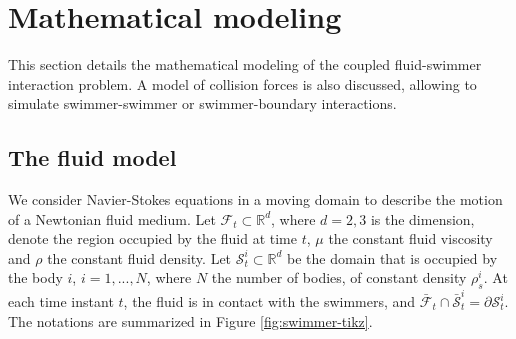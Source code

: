 \documentclass[graybox]{svmult}
\newcommand{\Fluid}{\mathcal{F}} %
\newcommand{\Real}{\mathbb{R}} %
\newcommand{\Density}{\rho} %
\newcommand{\Solid}{\mathcal{S}} %
\newcommand{\CompDomain}{\Fluid}
\newcommand{\R}{\mathbb{R}}
\begin{document}



\section{Mathematical modeling}
\label{Sec:MathModeling}
This section details the mathematical modeling of the coupled fluid-swimmer interaction problem. A model of collision forces is also discussed, allowing to simulate swimmer-swimmer or swimmer-boundary interactions.


\subsection{The fluid model}

We consider Navier-Stokes equations in a moving domain to describe the motion of a Newtonian fluid medium. 
Let $\CompDomain_t\subset \R^d$, where $d=2,3$ is the dimension, denote the region occupied by the fluid at time $t$, $\mu$  the constant fluid viscosity and $\Density$ the constant fluid density. Let $\Solid_t^i \subset \R^d$ be the domain that is occupied by the body $i$, $i = 1,...,N$, where $N$ the number of bodies, of constant density $\Density_s^i$. At each time instant $t$, the fluid is in contact with the swimmers, and $\bar{\CompDomain}_{t} \cap \bar{\Solid}_t^i = \partial \Solid_t^i$.
The notations are summarized in Figure \ref{fig:swimmer-tikz}.
\end{document}
